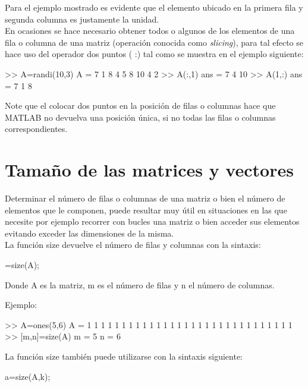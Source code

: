 Para el ejemplo mostrado es evidente que el elemento ubicado en la
primera fila y segunda columna es justamente la unidad. \\

En ocasiones se hace necesario obtener todos o algunos de los elementos
de una fila o columna de una matriz (operación conocida como
\emph{slicing}), para tal efecto se hace uso del operador dos puntos ( :) 
tal como se muestra en el ejemplo siguiente:

\begin{matlab}
>> A=randi(10,3)
A =
     7     1     8
     4     5     8
    10     4     2
>> A(:,1)
ans =
     7
     4
    10
>> A(1,:)
ans =
     7     1     8
\end{matlab}

Note que el colocar dos puntos en la posición de filas o columnas hace
que MATLAB no devuelva una posición única, si no todas las filas o
columnas correspondientes.

\section{Tamaño de las matrices y vectores}\label{tamanio-de-las-matrices-y-vectores}

Determinar el número de filas o columnas de una matriz o bien el número
de elementos que le componen, puede resultar muy útil en situaciones en
las que necesite por ejemplo recorrer con bucles una matriz o bien
acceder sus elementos evitando exceder las dimensiones de la misma. \\

La función size devuelve el número de filas y columnas con la sintaxis:

\begin{matlab}
[m,n]=size(A);
\end{matlab}

Donde A es la matriz, m es el número de filas y n el número de columnas.

Ejemplo:

\begin{matlab}
>> A=ones(5,6)
A =
     1     1     1     1     1     1
     1     1     1     1     1     1
     1     1     1     1     1     1
     1     1     1     1     1     1
     1     1     1     1     1     1
>> [m,n]=size(A)
m =
     5
n =
     6
\end{matlab}

La función size también puede utilizarse con la sintaxis siguiente:

\begin{matlab}
a=size(A,k);
\end{matlab}

